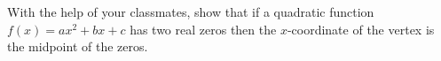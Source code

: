 {With the help of your classmates, show that if a quadratic function $f(x) = ax^{2} + bx + c$ has two real zeros then the $x$-coordinate of the vertex is the midpoint of the zeros.}
{}